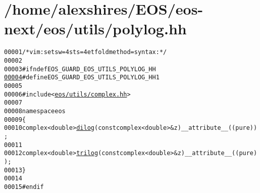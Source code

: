 \hypertarget{polylog_8hh_source}{
\section{/home/alexshires/EOS/eos-\/next/eos/utils/polylog.hh}
}


\begin{footnotesize}\begin{alltt}
00001 \textcolor{comment}{/* vim: set sw=4 sts=4 et foldmethod=syntax : */}
00002 
00003 \textcolor{preprocessor}{#ifndef EOS\_GUARD\_EOS\_UTILS\_POLYLOG\_HH}
\hypertarget{polylog_8hh_source_l00004}{}\hyperlink{polylog_8hh_a26b565278b6b73270f9c0215b0e40640}{00004} \textcolor{preprocessor}{}\textcolor{preprocessor}{#define EOS\_GUARD\_EOS\_UTILS\_POLYLOG\_HH 1}
00005 \textcolor{preprocessor}{}
00006 \textcolor{preprocessor}{#include <\hyperlink{complex_8hh}{eos/utils/complex.hh}>}
00007 
00008 \textcolor{keyword}{namespace }eos
00009 \{
00010     complex<double> \hyperlink{namespaceeos_a7fb80dc36d6e29adfbde318a197ea591}{dilog}(\textcolor{keyword}{const} complex<double> & z) \_\_attribute\_\_ ((pure));
00011 
00012     complex<double> \hyperlink{namespaceeos_a38a0279ef72ff9c1bdb17dd7956a199a}{trilog}(\textcolor{keyword}{const} complex<double> & z) \_\_attribute\_\_ ((pure));
00013 \}
00014 
00015 \textcolor{preprocessor}{#endif}
\end{alltt}\end{footnotesize}
